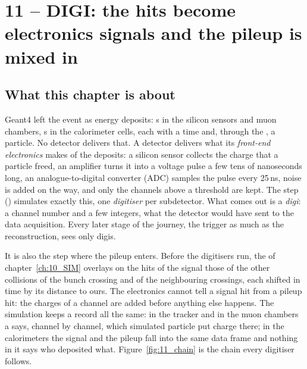 
\chapter{11 -- DIGI: the hits become electronics signals and the pileup is mixed in}
\label{ch:11_DIGI}

\section{What this chapter is about}

Geant4 left the event as energy deposits: s in the silicon sensors and muon chambers, s
in the calorimeter cells, each with a time and, through the , a particle. No detector delivers that. A
detector delivers what its \emph{front-end electronics} makes of the deposits: a silicon sensor collects the charge
that a particle freed, an amplifier turns it into a voltage pulse a few tens of nanoseconds long, an analogue-to-digital
converter (ADC) samples the pulse every 25\,ns, noise is added on the way, and only the channels above a threshold are
kept. The  step () simulates exactly this, one \emph{digitiser} per
subdetector. What comes out is a \emph{digi}: a channel number and a few integers, what the detector would have sent
to the data acquisition. Every later stage of the journey, the trigger as much as the reconstruction, sees only digis.

It is also the step where the pileup enters. Before the digitisers run, the  of
chapter~\ref{ch:10_SIM} overlays on the hits of the signal those of the other collisions of the bunch crossing and of
the neighbouring crossings, each shifted in time by its distance to ours. The electronics cannot tell a signal hit from
a pileup hit: the charges of a channel are added before anything else happens. The simulation keeps a record all the
same: in the tracker and in the muon chambers a  says, channel by channel, which simulated particle
put charge there; in the calorimeters the signal and the pileup fall into the same data frame and nothing in it says
who deposited what. Figure~\ref{fig:11_chain} is the chain every digitiser follows.

